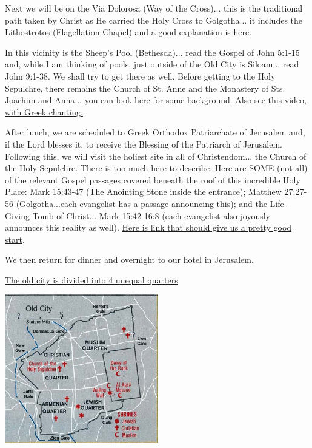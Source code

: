 \documentclass[letterpaper]{report}
\begin{document}
Next we will be on the Via Dolorosa (Way of the Cross)...
this is the traditional path taken by Christ as He carried the Holy Cross to
Golgotha...
it includes the Lithostrotos (Flagellation Chapel) and 
\href{http://www.mikemasonbooks.com/the-lithostrotos-chapter-57-of-jesus-his-story-in-stone/}{
	a good explanation is here}.

In this vicinity is the Sheep's Pool (Bethesda)...
read the Gospel of John 5:1-15 and, while I am thinking of pools,
just outside of the Old City is Siloam...
read John 9:1-38. We shall try to get there as well.
Before getting to the Holy Sepulchre,
there remains the Church of St. Anne and the Monastery of Sts. Joachim and
Anna...\href{http://www.seetheholyland.net/church-of-st-anne/}{
	you can look here} for some background.
\href{http://www.johnsanidopoulos.com/2011/09/video-home-of-sts-joachim-and-anna-in.html}{
Also see this video, with Greek chanting.}

After lunch, we are scheduled to Greek Orthodox Patriarchate of Jerusalem and,
if the Lord blesses it, to receive the Blessing of the Patriarch of Jerusalem.
Following this, we will visit the holiest site in all of Christendom...
the Church of the Holy Sepulchre.
There is too much here to describe.
Here are SOME (not all) of the relevant Gospel passages covered beneath the 
roof of this incredible Holy Place:
Mark 15:43-47 (The Anointing Stone inside the entrance);
Matthew 27:27-56 (Golgotha...each evangelist has a passage announcing this); 
and the Life-Giving Tomb of Christ...
Mark 15:42-16:8
(each evangelist also joyously announces this reality as well).
\href{https://orthodoxwiki.org/Church_of_the_Holy_Sepulchre_(Jerusalem)}{
	Here is link that should give us a pretty good start}.

We then return for dinner and overnight to our hotel in Jerusalem.

\href{http://wikitravel.org/en/Jerusalem/Old_City}{
	The old city is divided into 4 unequal quarters}

\includegraphics[width=0.5\textwidth]{MapJerusalemOldCity}
\end{document}
